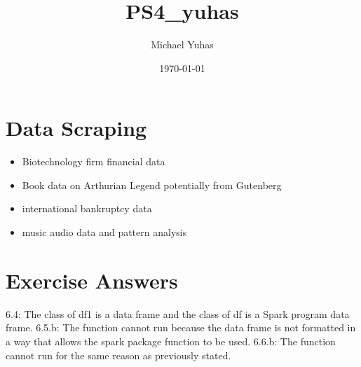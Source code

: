 \documentclass{article}
\title{PS4_yuhas}
\author{Michael Yuhas}
\date{\today}
\begin{document}
\maketitle

\section{Data Scraping}
 \begin{itemize}
    \item Biotechnology firm financial data
    \item Book data on Arthurian Legend potentially from Gutenberg
    \item international bankruptcy data
    \item music audio data and pattern analysis
\end{itemize}

\section{Exercise 
Answers} 6.4: The class of df1 is a data frame and the class of df is a Spark 
program data frame.
6.5.b: The function cannot run because the data frame is not 
formatted in a way that allows the spark package function to be used.
6.6.b: The 
function cannot run for the same reason as previously stated.
\end{document}
